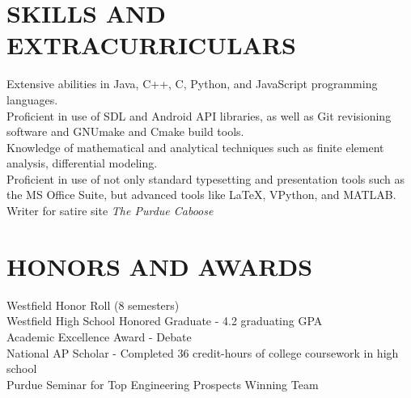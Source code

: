 \documentclass[10pt]{res}
\begin{document}
\begin{resume}
\section{SKILLS AND EXTRACURRICULARS}          
    Extensive abilities in Java, C++, C, Python, and JavaScript programming languages. \\
	Proficient in use of SDL and Android API libraries, as well as Git revisioning software and GNUmake and Cmake build tools. \\
	Knowledge of mathematical and analytical techniques such as finite element analysis, differential modeling. \\
	Proficient in use of not only standard typesetting and presentation tools such as the MS Office Suite, but advanced tools like \LaTeX, VPython, and MATLAB. \\
	Writer for satire site \emph{The Purdue Caboose}
 
\section{HONORS AND AWARDS}          
    Westfield Honor Roll (8 semesters) \\
	Westfield High School Honored Graduate - 4.2 graduating GPA \\
	Academic Excellence Award - Debate \\
	National AP Scholar - Completed 36 credit-hours of college coursework in high school \\
	Purdue Seminar for Top Engineering Prospects Winning Team \\
 
 
\end{resume}
\end{document}
